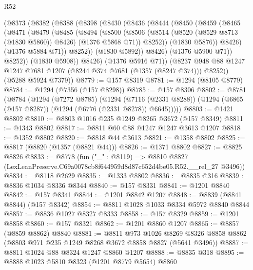 \begin{lexlean}{R52}
\begin{coremodule}
      (@8373
        (@8382
          (@8388
            (@8398
              (@8430
                (@8436
                  (@8444
                    (@8450
                      (@8459
                        (@8465
                          (@8471
                            (@8479
                              (@8485
                                (@8494
                                  (@8500
                                    (@8506
                                      (@8514
                                        (@8520 (@8529 @8713 (@1830 @5860)) @8426)
                                        (@1376 @5868 @71))
                                      @8252))
                                  (@1830 @5876))
                                @8426)
                              (@1376 @5884 @71))
                            @8252))
                        (@1830 @5892))
                      @8426)
                    (@1376 @5900 @71))
                  @8252))
              (@1830 @5908))
            @8426)
          (@1376 @5916 @71))
        (@8237 @948 @88 @1247 @1247 @7681 @1207 (@8244 @374 @7681 (@1357 (@8247 @374))) @8252))
      (@5288 @5924 @7379))
@8779 := @157 @8319
@8781 := @1294 (@8105 @8779)
@8784 := @1294 (@7356 (@157 @8298))
@8785 := @157 @8306
@8802 := @8781
    (@8784
      (@1294
        (@7272 @8785)
        (@1294
          (@7116 (@2331 @8288))
          (@1294 (@6865 (@157 @8287)) (@1294 (@6776 (@2331 @8278)) @6645)))))
@8803 := @1421 @8802
@8810 := @8803 @1016 @235 @1249 @8265 @3672 (@157 @8349)
@8811 := @1343 @8802
@8817 := @8811 @60 @88 @1247 @1247 @3613 @1207
@8818 := @1352 @8802
@8820 := @8818 @44 @3613
@8821 := @1358 @8802
@8825 := @8817 (@8820 (@1357 (@8821 @44)))
@8826 := @1371 @8802
@8827 := @8825 @8826
@8833 := @8778
    (fun ("_" : @8119) =>
    @8810 @8827 (LexLeanPreserve.C69a0078cb8f644959d8d87c652d4be05.R52.__rel_27 @3496))
@8834 := @8118 @2629
@8835 := @1333 @8802
@8836 := @8835 @316
@8839 := @8836 @1034 @8336 @8344
@8840 := @157 @8331
@8841 := @1201 @8840
@8842 := @157 @8341
@8844 := @1201 @8842 @1207
@8848 := @8839 (@8841 @8844) (@157 @8342)
@8854 := @8811 @1028 @1033 @8334 @5972 @8840 @8844
@8857 := @8836 @1027 @8327 @8333
@8858 := @157 @8329
@8859 := @1201 @8858
@8860 := @157 @8321
@8862 := @1201 @8860 @1207
@8865 := @8857 (@8859 @8862) @8840
@8881 := @8811
    @973
    @1026
    @8269
    @8326
    @8858
    @8862
    (@8803 @971 @235 @1249 @8268 @3672 @8858 @8827 (@5641 @3496))
@8887 := @8811 @1024 @88 @8324 @1247 @8860 @1207
@8888 := @8835 @318
@8895 := @8888 @1023 @5810 @8323 (@1201 @8779 @5654) @8860

\end{coremodule}
\end{lexlean}
